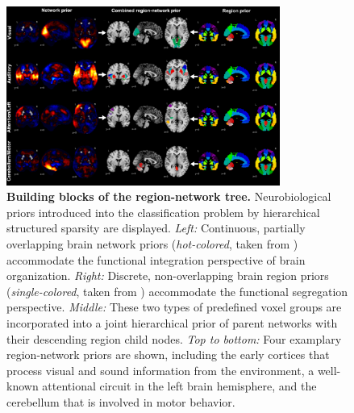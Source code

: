 \documentclass{article}
\begin{document}
\begin{figure}
\centering
\includegraphics[width=0.8\textwidth]{../figures/reg_net_prior_colin.pdf}
\vspace{-0.2cm}
\caption{\textbf{Building blocks of the region-network tree.}
Neurobiological priors introduced into the classification problem 
by hierarchical structured sparsity are displayed.
\textit{Left:} Continuous, partially overlapping brain network priors
(\textit{hot-colored}, taken from \cite{smith2009})
accommodate the functional integration
perspective of brain organization.
\textit{Right:} Discrete, non-overlapping brain region priors
(\textit{single-colored}, taken from \cite{crad12})
accommodate the functional segregation perspective.
\textit{Middle:} These two types of predefined voxel groups are incorporated
into a joint hierarchical prior of parent networks with their
descending region child nodes.
\textit{Top to bottom:} Four examplary region-network priors
are shown, including
the early cortices that process
visual and sound information from the environment,
a well-known attentional circuit in the left brain hemisphere,
and
the cerebellum that is involved in motor behavior.
}
\label{fig_priors}
\end{figure}
\end{document}
